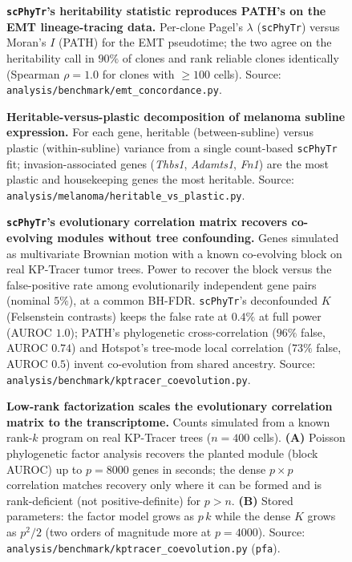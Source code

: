 \documentclass{article}
\newcommand{\scphytr}{\texttt{scPhyTr}}
\begin{document}
\begin{figure}[t]
  \centering
  \caption{\textbf{\scphytr{}'s heritability statistic reproduces PATH's on the EMT
  lineage-tracing data.} Per-clone Pagel's $\lambda$ (\scphytr{}) versus Moran's $I$ (PATH)
  for the EMT pseudotime; the two agree on the heritability call in $90\%$ of clones and rank
  reliable clones identically (Spearman $\rho = 1.0$ for clones with $\geq 100$ cells).
  Source: \texttt{analysis/benchmark/emt\_concordance.py}.}
  \label{fig:emt}
\end{figure}

\begin{figure}[t]
  \centering
  \caption{\textbf{Heritable-versus-plastic decomposition of melanoma subline expression.}
  For each gene, heritable (between-subline) versus plastic (within-subline) variance from a
  single count-based \scphytr{} fit; invasion-associated genes (\emph{Thbs1}, \emph{Adamts1},
  \emph{Fn1}) are the most plastic and housekeeping genes the most heritable. Source:
  \texttt{analysis/melanoma/heritable\_vs\_plastic.py}.}
  \label{fig:melanoma}
\end{figure}

\begin{figure}[t]
  \centering
  \caption{\textbf{\scphytr{}'s evolutionary correlation matrix recovers co-evolving modules
  without tree confounding.} Genes simulated as multivariate Brownian motion with a known
  co-evolving block on real KP-Tracer tumor trees. Power to recover the block versus the
  false-positive rate among evolutionarily independent gene pairs (nominal $5\%$), at a common
  BH-FDR. \scphytr{}'s deconfounded $K$ (Felsenstein contrasts) keeps the false rate at
  $0.4\%$ at full power (AUROC $1.0$); PATH's phylogenetic cross-correlation ($96\%$ false,
  AUROC $0.74$) and Hotspot's tree-mode local correlation ($73\%$ false, AUROC $0.5$) invent
  co-evolution from shared ancestry. Source:
  \texttt{analysis/benchmark/kptracer\_coevolution.py}.}
  \label{fig:coevo}
\end{figure}

\begin{figure}[t]
  \centering
  \caption{\textbf{Low-rank factorization scales the evolutionary correlation matrix to the
  transcriptome.} Counts simulated from a known rank-$k$ program on real KP-Tracer trees
  ($n = 400$ cells). \textbf{(A)} Poisson phylogenetic factor analysis recovers the planted
  module (block AUROC) up to $p = 8000$ genes in seconds; the dense $p \times p$ correlation
  matches recovery only where it can be formed and is rank-deficient (not positive-definite)
  for $p > n$. \textbf{(B)} Stored parameters: the factor model grows as $p\,k$ while the dense
  $K$ grows as $p^2/2$ (two orders of magnitude more at $p = 4000$). Source:
  \texttt{analysis/benchmark/kptracer\_coevolution.py} (\texttt{pfa}).}
  \label{fig:pfa}
\end{figure}
\end{document}
